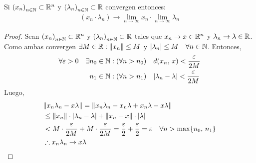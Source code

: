 \begin{prop}
  Si \({(x_n)}_{n \in \mathbb{N}} \subset \mathbb{R}^n\) y \({(\lambda_n)}_{n \in \mathbb{N}} \subset \mathbb{R} \) convergen entonces:\begin{align*}
    (x_n \cdot \lambda_n) \to \lim_{n \to \infty} x_n \cdot \lim_{n \to \infty} \lambda_n
  \end{align*}
  \begin{proof}
    Sean \({(x_n)}_{n \in \mathbb{N}} \subset \mathbb{R}^n\) y \({(\lambda_n)}_{n \in \mathbb{N}} \subset \mathbb{R} \) tales que \( x_n \to x \in \mathbb{R}^n \) y \( \lambda_n \to \lambda \in \mathbb{R} \).
    Como ambas convergen \( \exists M \in \mathbb{R} : \|x_n\| \leq M \) y \( |\lambda_n| \leq M \quad \forall n \in \mathbb{N} \). 
    Entonces, \begin{align*}
      \forall \varepsilon > 0 \quad \exists & n_0 \in \mathbb{N} : (\forall n > n_0) \quad d(x_n\text{, }x) < \frac{\varepsilon}{2M} \\
                             & n_1 \in \mathbb{N} : (\forall n > n_1) \quad |\lambda_n - \lambda| < \frac{\varepsilon}{2M}
    \end{align*} 
    Luego,\begin{align*}
      & \| x_n \lambda_n - x \lambda \| = \| x_n \lambda_n - x_n \lambda + x_n \lambda - x \lambda \| \\
      & \leq \| x_n \| \cdot |\lambda_n - \lambda| + \| x_n - x \| \cdot |\lambda| \\
      & < M \cdot \frac{\varepsilon}{2M} + M \cdot \frac{\varepsilon}{2M} = \frac{\varepsilon}{2} + \frac{\varepsilon}{2} = \varepsilon \quad \forall n > \max \{ n_0\text{, }n_1 \} \\
      & \therefore x_n \lambda_n \to x \lambda
    \end{align*}
  \end{proof}
\end{prop}

